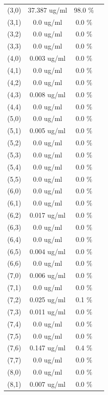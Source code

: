 \documentclass{article}
\begin{document}
\begin{tabular}{c c c c}
(3,0)&        37.387 ug/ml        &98.0 \%\\
(3,1)&        0.0 ug/ml        &0.0 \%\\
(3,2)&        0.0 ug/ml        &0.0 \%\\
(3,3)&        0.0 ug/ml        &0.0 \%\\
(4,0)&        0.003 ug/ml        &0.0 \%\\
(4,1)&        0.0 ug/ml        &0.0 \%\\
(4,2)&        0.0 ug/ml        &0.0 \%\\
(4,3)&        0.008 ug/ml        &0.0 \%\\
(4,4)&        0.0 ug/ml        &0.0 \%\\
(5,0)&        0.0 ug/ml        &0.0 \%\\
(5,1)&        0.005 ug/ml        &0.0 \%\\
(5,2)&        0.0 ug/ml        &0.0 \%\\
(5,3)&        0.0 ug/ml        &0.0 \%\\
(5,4)&        0.0 ug/ml        &0.0 \%\\
(5,5)&        0.0 ug/ml        &0.0 \%\\
(6,0)&        0.0 ug/ml        &0.0 \%\\
(6,1)&        0.0 ug/ml        &0.0 \%\\
(6,2)&        0.017 ug/ml        &0.0 \%\\
(6,3)&        0.0 ug/ml        &0.0 \%\\
(6,4)&        0.0 ug/ml        &0.0 \%\\
(6,5)&        0.004 ug/ml        &0.0 \%\\
(6,6)&        0.0 ug/ml        &0.0 \%\\
(7,0)&        0.006 ug/ml        &0.0 \%\\
(7,1)&        0.0 ug/ml        &0.0 \%\\
(7,2)&        0.025 ug/ml        &0.1 \%\\
(7,3)&        0.011 ug/ml        &0.0 \%\\
(7,4)&        0.0 ug/ml        &0.0 \%\\
(7,5)&        0.0 ug/ml        &0.0 \%\\
(7,6)&        0.147 ug/ml        &0.4 \%\\
(7,7)&        0.0 ug/ml        &0.0 \%\\
(8,0)&        0.0 ug/ml        &0.0 \%\\
(8,1)&        0.007 ug/ml        &0.0 \%\\

\end{tabular}
\end{document}
